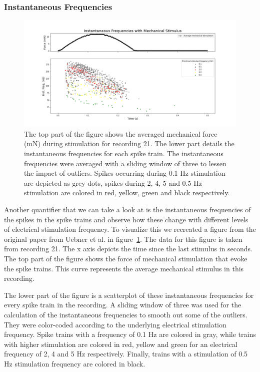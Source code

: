 \subsubsection{Instantaneous Frequencies}
\begin{figure}
	\includegraphics[width = \textwidth]{src/pic/11_12_13U1b_inst_freqs}
	\caption{The top part of the figure shows the averaged mechanical force (mN) during stimulation for recording 21. The lower part details the instantaneous frequencies for each spike train. The instantaneous frequencies were averaged with a sliding window of three to lessen the impact of outliers. Spikes occurring during 0.1 Hz stimulation are depicted as grey dots, spikes during 2, 4, 5 and 0.5 Hz stimulation are colored in red, yellow, green and black respectively.}
	\label{fig:inst_freqs}
\end{figure}
Another quantifier that we can take a look at is the instantaneous frequencies of the spikes in the spike trains and observe how these change with different levels of electrical stimulation frequency. To visualize this we recreated a figure from the original paper from Uebner et al. in figure~\ref{fig:inst_freqs}. The data for this figure is taken from recording 21. The x axis depicts the time since the last stimulus in seconds. The top part of the figure shows the force of mechanical stimulation that evoke the spike trains. This curve represents the average mechanical stimulus in this recording. 

The lower part of the figure is a scatterplot of these instantaneous frequencies for every spike train in the recording. A sliding window of three was used for the calculation of the instantaneous frequencies to smooth out some of the outliers. They were color-coded according to the underlying electrical stimulation frequency. Spike trains with a frequency of 0.1 Hz are colored in gray, while trains with higher stimulation are colored in red, yellow and green for an electrical frequency of 2, 4 and 5 Hz respectively. Finally, trains with a stimulation of 0.5 Hz stimulation frequency are colored in black. 

